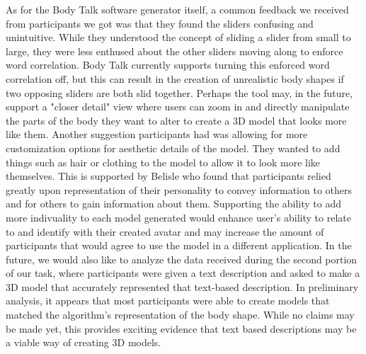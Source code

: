 \documentclass[journal]{vgtc}                %
\begin{document}
\noindent As for the Body Talk software generator itself, a common feedback we received from participants we got was that they found
the sliders confusing and unintuitive. While they understood the concept of sliding a slider from small to large, they were less
enthused about the other sliders moving along to enforce word correlation. Body Talk currently supports turning this enforced
word correlation off, but this can result in the creation of unrealistic body shapes if two opposing sliders are both slid together.
Perhaps the tool may, in the future, support a "closer detail" view where users can zoom in and directly manipulate the parts of the
body they want to alter to create a 3D model that looks more like them.
\newline\newline
\noindent
Another suggestion participants had was allowing for more customization options for aesthetic details of the model. They wanted to
add things such as hair or clothing to the model to allow it to look more like themselves. This is supported by Belisle
\cite{Belisle:2010:PM} who found that participants relied greatly upon representation of their personality to convey information
to others and for others to gain information about them\cite{WDMAS}. Supporting the ability to add more indivuality to each model
generated would enhance user's ability to relate to and identify with their created avatar and may increase the amount of
participants that would agree to use the model in a different application.
\newline\newline
\noindent In the future, we would also like to analyze the data received during the second portion of our task, where participants
were given a text description and asked to make a 3D model that accurately represented that text-based description. In
preliminary analysis, it appears that most participants were able to create models that matched the algorithm's representation of the
body shape. While no claims may be made yet, this provides exciting evidence that text based descriptions may be a viable way of
creating 3D models.
\end{document}
